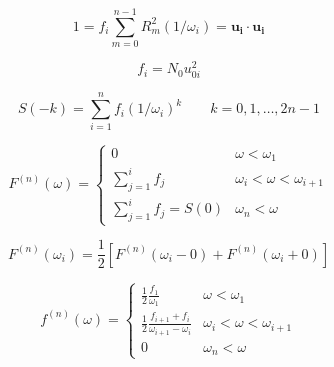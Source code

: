 \begin{equation}
  1 = f_i \sum\limits_{m=0}^{n-1} R_m^2 (1/\omega_i) = \mathbf{u_i} \cdot \mathbf{u_i}
\end{equation}

\begin{equation}
  f_i = N_0 u_{0i}^2
\end{equation}

\begin{equation}
  S(-k) = \sum\limits_{i=1}^n f_i (1/\omega_i)^k \quad\quad k=0,1,\dots,2n-1
\end{equation}

\begin{equation}
  F^{(n)} (\omega) =
  \begin{cases}
    0                                & \omega < \omega_1\\
    \sum\limits_{j=1}^{i} f_j        & \omega_i < \omega < \omega_{i+1}\\
    \sum\limits_{j=1}^{i} f_j = S(0) & \omega_n < \omega
  \end{cases}
\end{equation}

\begin{equation}
  F^{(n)} (\omega_i) = \frac 12 \left[ F^{(n)} (\omega_i - 0)
                       + F^{(n)} (\omega_i+0) \right]
\end{equation}

\begin{equation}
  f^{(n)} (\omega) =
  \begin{cases}
    \frac 12 \frac{f_1}{\omega_1}    & \omega < \omega_1\\
    \frac 12 \frac{f_{i+1} + f_i}{\omega_{i+1} - \omega_i}
                                     & \omega_i < \omega < \omega_{i+1}\\
    0                                & \omega_n < \omega
  \end{cases}
\end{equation}

%
%
%
%
%
%
%
%
%
%
%
%
%
%
%
%
%
%
%
